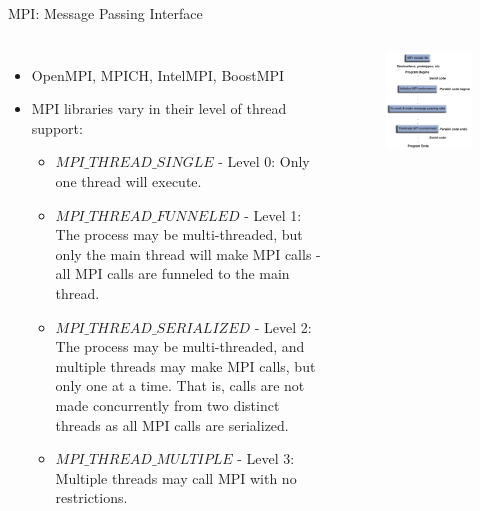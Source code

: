 \documentclass[10pt,times]{beamer}
\begin{document}
\begin{frame}{MPI: Message Passing Interface}
\begin{columns}
\begin{itemize}
\item OpenMPI, MPICH, IntelMPI, BoostMPI
\item MPI libraries vary in their level of thread support:
\begin{itemize}
\item $MPI\_THREAD\_SINGLE$ - Level 0: Only one thread will execute.

\item $MPI\_THREAD\_FUNNELED$ - Level 1: The process may be multi-threaded, but 
only the main thread will make MPI calls - all MPI calls are funneled to the main 
thread.

\item $MPI\_THREAD\_SERIALIZED$ - Level 2: The process may be multi-threaded, and 
multiple threads may make MPI calls, but only one at a time. That is, calls are not 
made concurrently from two distinct threads as all MPI calls are serialized.

\item $MPI\_THREAD\_MULTIPLE$ - Level 3: Multiple threads may call MPI with no 
    restrictions. 
\end{itemize}
\end{itemize}
\begin{figure}
\includegraphics[width=\linewidth]{figs/mpi.png}
\end{figure}
\end{columns}
\end{frame}
\end{document}
